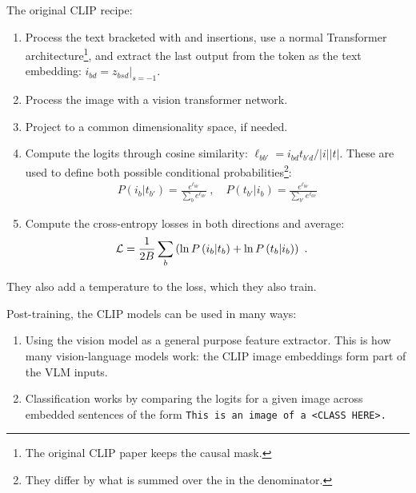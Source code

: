 The original CLIP recipe:
\begin{enumerate}
    \item Process the text bracketed with \pyinline{[SOS]} and \pyinline{[EOS]} insertions, use a
        normal Transformer architecture\footnote{The original CLIP paper keeps the causal mask.},
        and extract the last output from the \pyinline{[EOS]} token as the text embedding: $ i _{ bd
        }= z _{ bsd }\big|_{ s=-1 } $.
    \item Process the image with a vision transformer network.
    \item Project to a common dimensionality space, if needed.
    \item Compute the logits through cosine similarity: $ \ell _{ b b' } = i _{ bd }t _{ b'd }/ |i||t| $. These are used to
        define both possible conditional probabilities\footnote{They differ by what is summed over the in the denominator.}:
        \begin{align}
         P(i_b|t _{ b' }) =  \frac{ e ^{ \ell _{b b'} } }{ \sum _{ b  } e ^{ \ell _{b b'} } }  \ ,
         \quad P(t _{ b' }| i _{ b }) =  \frac{ e ^{ \ell _{b b'} } }{ \sum _{ b' }  e ^{ \ell _{b b'} } }
        \end{align}
    \item Compute the cross-entropy losses in both directions and average:
        \begin{align}
           \mathcal{L}  &= \frac{ 1 }{ 2B }\sum _{ b } \left (\ln P \left ( i_b|t_b \right ) + \ln P \left ( t_b|i_b \right )\right ) \label{eq_clip_loss} \ .
        \end{align}
\end{enumerate}
They also add a temperature to the loss, which they also train.

Post-training, the CLIP models can be used in many ways:
\begin{enumerate}
    \item Using the vision model as a general purpose feature extractor. This is how many
        vision-language models work: the CLIP image embeddings form part of the VLM inputs.
    \item Classification works by comparing the logits for a given image across embedded sentences
        of the form \texttt{This is an image of a <CLASS HERE>.}
\end{enumerate}


